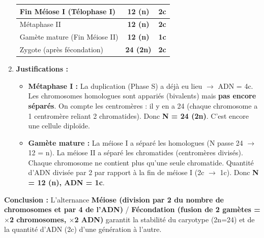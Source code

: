 \documentclass[11pt]{article}
\begin{document}
\begin{exoresolu}
\begin{enumerate}
\begin{center}
\begin{tabular}{|l|cc|}
                Fin Méiose I (Télophase I) & \textbf{12 (n)} & \textbf{2c} \\ \hline
                Métaphase II & \textbf{12 (n)} & \textbf{2c} \\ \hline
                Gamète mature (Fin Méiose II) & \textbf{12 (n)} & \textbf{1c} \\ \hline
                Zygote (après fécondation) & \textbf{24 (2n)} & \textbf{2c} \\ \hline
            \end{tabular}
        \end{center}
        \item \textbf{Justifications :}
            \begin{itemize}
                \item \textbf{Métaphase I :} La duplication (Phase S) a déjà eu lieu $\rightarrow$ ADN = 4c. Les chromosomes homologues sont appariés (bivalents) mais \textbf{pas encore séparés}. On compte les centromères : il y en a 24 (chaque chromosome a 1 centromère reliant 2 chromatides). Donc \textbf{N = 24 (2n)}. C'est encore une cellule diploïde.
                \item \textbf{Gamète mature :} La méiose I a séparé les homologues (N passe 24 $\rightarrow$ 12 = n). La méiose II a séparé les chromatides (centromères divisés). Chaque chromosome ne contient plus qu'une seule chromatide. Quantité d'ADN divisée par 2 par rapport à la fin de méiose I (2c $\rightarrow$ 1c). Donc \textbf{N = 12 (n), ADN = 1c}.
            \end{itemize}
    \end{enumerate}
    \textbf{Conclusion :} L'alternance \textbf{Méiose (division par 2 du nombre de chromosomes et par 4 de l'ADN)} / \textbf{Fécondation (fusion de 2 gamètes = $\times$2 chromosomes, $\times$2 ADN)} garantit la stabilité du caryotype (2n=24) et de la quantité d'ADN (2c) d'une génération à l'autre.
\end{exoresolu}
\end{document}
